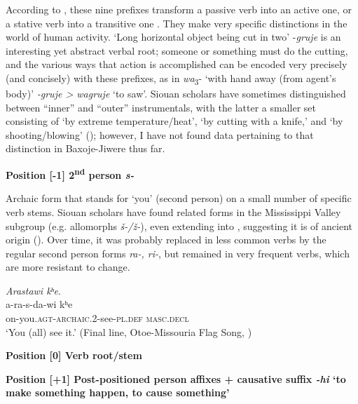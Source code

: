 \documentclass[output=paper]{LSP/langsci}
\begin{document}
According to \citet[246]{Whitman1947}, these nine prefixes transform a passive verb into an active one, or a stative verb into a transitive one \citep[483]{Rankin2005b}. They make very specific distinctions in the world of human activity. `Long horizontal object being cut in two' -\textit{gruje} is an interesting yet abstract verbal root; someone or something must do the cutting, and the various ways that action is accomplished can be encoded very precisely (and concisely) with these prefixes, as in \textit{wa}\textsubscript{3}- `with hand away (from agent's body)' \textit{-gruje > wagruje} `to saw'.  Siouan scholars have sometimes distinguished between ``inner'' and ``outer'' instrumentals, with the latter a smaller set consisting of `by extreme temperature/heat', `by cutting with a knife,' and `by shooting/blowing' (\citealt[483-485]{Rankin2005b}); however, I have not found data pertaining to that distinction in Baxoje-Jiwere thus far.   		
     
\vspace{1em}
\textbf{Position [-1]  2\textsuperscript{nd} person \textit{s-} }

Archaic form that stands for `you' (second person) on a small number of specific verb stems.  Siouan scholars have found related forms in the Mississippi Valley subgroup (e.g.  allomorphs \textit{\v{s}-/\v{z}-}), even extending into , suggesting it is of ancient origin (\citealt[479-480]{Rankin2005b}).  Over time, it was probably replaced in less common verbs by the regular second person forms \textit{ra-, ri-}, but remained in very frequent verbs, which are more resistant to change.        

\begin{exe}
\ex 
\glll \textit{Arastawi kʰe}.\\
 a-ra-s-da-wi  kʰe  \\
on-you.\textsc{agt-archaic}.2-see-\textsc{pl.def} \textsc{masc.decl} \\
\trans `You (all) see it.'  (Final line, Otoe-Missouria Flag Song, \citealt{Greer2008})     
\end{exe}     
					 
\textbf{Position [0]  Verb root/stem}

\vspace{1em}
\textbf{Position [+1] Post-positioned person affixes + causative suffix  \textit{-hi} `to make something happen, to cause something'}
\end{document}
